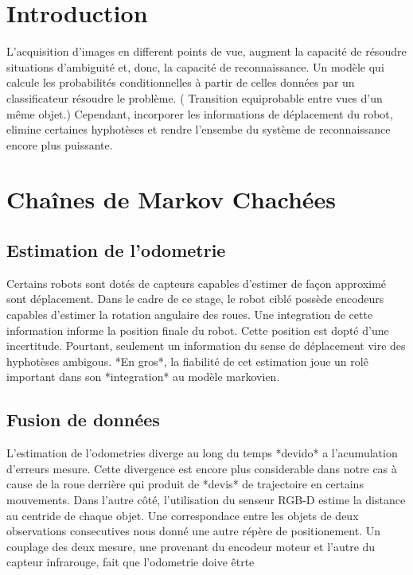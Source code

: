\section {Introduction}

L'acquisition d'images en different points de vue, augment la capacité de résoudre situations d'ambiguité et, donc, la capacité de reconnaissance. Un modèle qui calcule les probabilités conditionnelles à partir de celles données par un classificateur résoudre le problème. ( Transition equiprobable entre vues d'un même objet.) Cependant, incorporer les informations de déplacement du robot, elimine certaines hyphotèses et rendre l'ensembe du système de reconnaissance encore plus puissante.

\section {Chaînes de Markov Chachées}


\subsection{Estimation de l'odometrie}

Certains robots sont dotés de capteurs capables d'estimer de façon approximé sont déplacement. Dans le cadre de ce stage, le robot ciblé possède encodeurs capables d'estimer la rotation angulaire des roues. Une integration de cette information informe la position finale du robot. Cette position est dopté d'une incertitude. 
Pourtant, seulement un information du sense de déplacement vire des hyphotèses ambigous. *En gros*, la fiabilité de cet estimation joue un rolê important dans son *integration* au modèle markovien.



\subsection{Fusion de données }

L'estimation de l'odometries diverge au long du temps *devido* a l'acumulation d'erreurs mesure. Cette divergence est encore plus considerable dans notre cas à cause de la roue derrière qui produit de *devis* de trajectoire en certains mouvements. Dans l'autre côté, l'utilisation du senseur RGB-D estime la distance au centride de chaque objet. Une correspondace entre les objets de deux observations consecutives nous donné une autre répère de positionement. Un couplage des deux mesure, une provenant du encodeur moteur et l'autre du capteur infrarouge, fait que l'odometrie doive êtrte
